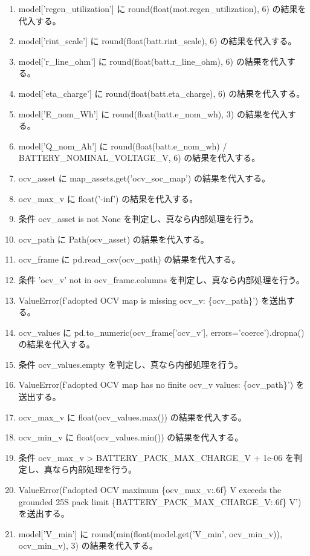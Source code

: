 \documentclass[a4paper,11pt]{article}
\begin{document}
\begin{enumerate}[leftmargin=1.8em]
\item model['regen\_utilization'] に round(float(mot.regen\_utilization), 6) の結果を代入する。
\item model['rint\_scale'] に round(float(batt.rint\_scale), 6) の結果を代入する。
\item model['r\_line\_ohm'] に round(float(batt.r\_line\_ohm), 6) の結果を代入する。
\item model['eta\_charge'] に round(float(batt.eta\_charge), 6) の結果を代入する。
\item model['E\_nom\_Wh'] に round(float(batt.e\_nom\_wh), 3) の結果を代入する。
\item model['Q\_nom\_Ah'] に round(float(batt.e\_nom\_wh) / BATTERY\_NOMINAL\_VOLTAGE\_V, 6) の結果を代入する。
\item ocv\_asset に map\_assets.get('ocv\_soc\_map') の結果を代入する。
\item ocv\_max\_v に float('-inf') の結果を代入する。
\item 条件 ocv\_asset is not None を判定し、真なら内部処理を行う。
\item   ocv\_path に Path(ocv\_asset) の結果を代入する。
\item   ocv\_frame に pd.read\_csv(ocv\_path) の結果を代入する。
\item   条件 'ocv\_v' not in ocv\_frame.columns を判定し、真なら内部処理を行う。
\item     ValueError(f'adopted OCV map is missing ocv\_v: \{ocv\_path\}') を送出する。
\item   ocv\_values に pd.to\_numeric(ocv\_frame['ocv\_v'], errors='coerce').dropna() の結果を代入する。
\item   条件 ocv\_values.empty を判定し、真なら内部処理を行う。
\item     ValueError(f'adopted OCV map has no finite ocv\_v values: \{ocv\_path\}') を送出する。
\item   ocv\_max\_v に float(ocv\_values.max()) の結果を代入する。
\item   ocv\_min\_v に float(ocv\_values.min()) の結果を代入する。
\item   条件 ocv\_max\_v > BATTERY\_PACK\_MAX\_CHARGE\_V + 1e-06 を判定し、真なら内部処理を行う。
\item     ValueError(f'adopted OCV maximum \{ocv\_max\_v:.6f\} V exceeds the grounded 25S pack limit \{BATTERY\_PACK\_MAX\_CHARGE\_V:.6f\} V') を送出する。
\item   model['V\_min'] に round(min(float(model.get('V\_min', ocv\_min\_v)), ocv\_min\_v), 3) の結果を代入する。

\end{enumerate}
\end{document}

